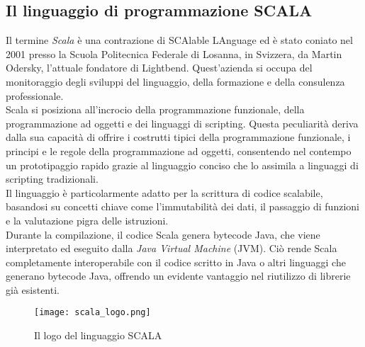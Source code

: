 \subsection[SCALA]{Il linguaggio di programmazione SCALA}
Il termine \textit{Scala} è una contrazione di SCAlable LAnguage ed è stato coniato nel 2001 presso la Scuola Politecnica Federale di Losanna, in Svizzera, da Martin Odersky, l'attuale fondatore di Lightbend.
Quest'azienda si occupa del monitoraggio degli sviluppi del linguaggio, della formazione e della consulenza professionale. \\
Scala si posiziona all'incrocio della programmazione funzionale, della programmazione ad oggetti e dei linguaggi di scripting.
Questa peculiarità deriva dalla sua capacità di offrire i costrutti tipici della programmazione funzionale, i principi e le regole della programmazione ad oggetti, consentendo nel contempo un prototipaggio rapido grazie al linguaggio conciso che lo assimila a linguaggi di scripting tradizionali. \\
Il linguaggio è particolarmente adatto per la scrittura di codice scalabile, basandosi su concetti chiave come l'immutabilità dei dati, il passaggio di funzioni e la valutazione pigra delle istruzioni. \\
Durante la compilazione, il codice Scala genera bytecode Java, che viene interpretato ed eseguito dalla \textit{Java Virtual Machine} (JVM).
Ciò rende Scala completamente interoperabile con il codice scritto in Java o altri linguaggi che generano bytecode Java, offrendo un evidente vantaggio nel riutilizzo di librerie già esistenti. 

\begin{figure}[H]
  \centering
  \texttt{[image: scala\_logo.png]}
  \caption[SCALA Logo]{Il logo del linguaggio SCALA \cite{scala}}
\end{figure}


